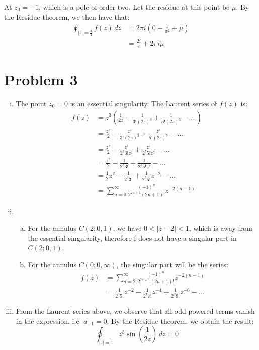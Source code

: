 \documentclass[letterpaper, titlepage, DIV=14]{scrartcl}
\begin{document}
    At $z_{0}=-1$, which is a pole of order two. Let the residue at this point be $\mu$. By the Residue theorem, we then have that:
    \begin{align*}
      \oint_{|z|=\frac{3}{2}} f(z) \, dz &= 2\pi i (0 + \frac{1}{\pi^{2}} + \mu) \\
        &= \frac{2i}{\pi} + 2\pi i \mu
    \end{align*}

    
    

    \section*{Problem 3}
    \begin{enumerate}[i)]
      \item The point $z_{0} = 0$ is an essential singularity. The Laurent series of $f(z)$ is:
      \begin{align*}
        f(z) &= z^{3}(\frac{1}{2z} - \frac{1}{3!(2z)^{3}} + \frac{1}{5!(2z)^{5}} - \ldots) \\
          &= \frac{z^{2}}{2} - \frac{z^{3}}{3!(2z)^{3}} + \frac{z^{3}}{5!(2z)^{5}} - \ldots \\
          &= \frac{z^{2}}{2} - \frac{z^{3}}{2^{3}3!z^{3}} + \frac{z^{3}}{2^{5}5!z^{5}} - \ldots \\ 
          &= \frac{z^{2}}{2} - \frac{1}{2^{3}3!} + \frac{1}{2^{5}5!z^{2}} - \ldots \\ 
          &= \frac{1}{2}z^{2} - \frac{1}{2^{3}3!} + \frac{1}{2^{5}5!}z^{-2} - \ldots \\ 
          &= \sum_{n=0}^{\infty}\frac{(-1)^{n}}{2^{2n+1}(2n+1)!}z^{-2(n-1)}
      \end{align*}
      
      
      \item
      \begin{enumerate}[a)]
        \item For the annulus $C(2;0,1)$, we have $0<|z-2|<1$, which is away from the essential singularity, therefore f does not have a singular part in $C(2;0,1)$.
        
        \item 
        For the annulus $C(0;0,\infty)$, the singular part will be the series:
        \begin{align*}
          f(z) &= \sum_{n=2}^{\infty}\frac{(-1)^{n}}{2^{2n+1}(2n+1)!}z^{-2(n-1)} \\
            &= \frac{1}{2^{5}5!}z^{-2} - \frac{1}{2^{7}7!}z^{-4} + \frac{1}{2^{9}9!}z^{-6} - \ldots
        \end{align*}
      \end{enumerate}
      
      \item From the Laurent series above, we observe that all odd-powered terms vanish in the expression, i.e. $a_{-1}=0$. By the Residue theorem, we obtain the result:
      \begin{equation*}
        \oint_{|z|=1} z^{3}\sin(\frac{1}{2z}) \, dz = 0
      \end{equation*}
    \end{enumerate}
    
\end{document}
